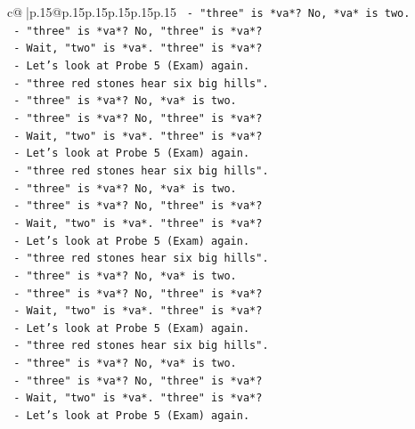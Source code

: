 \documentclass{article}
\begin{document}
{\begin{supertabular}{c@{$\;$}|p{.15\linewidth}@{}p{.15\linewidth}p{.15\linewidth}p{.15\linewidth}p{.15\linewidth}p{.15\linewidth}}
{{{\texttt{                {-} "three" is *va*? No, *va* is two.} \\
\texttt{                {-} "three" is *va*? No, "three" is *va*?} \\
\texttt{                {-} Wait, "two" is *va*. "three" is *va*?} \\
\texttt{                {-} Let's look at Probe 5 (Exam) again.} \\
\texttt{                {-} "three red stones hear six big hills".} \\
\texttt{                {-} "three" is *va*? No, *va* is two.} \\
\texttt{                {-} "three" is *va*? No, "three" is *va*?} \\
\texttt{                {-} Wait, "two" is *va*. "three" is *va*?} \\
\texttt{                {-} Let's look at Probe 5 (Exam) again.} \\
\texttt{                {-} "three red stones hear six big hills".} \\
\texttt{                {-} "three" is *va*? No, *va* is two.} \\
\texttt{                {-} "three" is *va*? No, "three" is *va*?} \\
\texttt{                {-} Wait, "two" is *va*. "three" is *va*?} \\
\texttt{                {-} Let's look at Probe 5 (Exam) again.} \\
\texttt{                {-} "three red stones hear six big hills".} \\
\texttt{                {-} "three" is *va*? No, *va* is two.} \\
\texttt{                {-} "three" is *va*? No, "three" is *va*?} \\
\texttt{                {-} Wait, "two" is *va*. "three" is *va*?} \\
\texttt{                {-} Let's look at Probe 5 (Exam) again.} \\
\texttt{                {-} "three red stones hear six big hills".} \\
\texttt{                {-} "three" is *va*? No, *va* is two.} \\
\texttt{                {-} "three" is *va*? No, "three" is *va*?} \\
\texttt{                {-} Wait, "two" is *va*. "three" is *va*?} \\
\texttt{                {-} Let's look at Probe 5 (Exam) again.} \\
}}}
\end{supertabular}}
\end{document}
